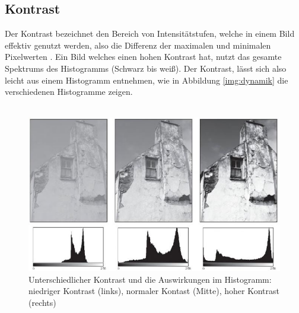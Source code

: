 \subsection{Kontrast}\label{s.kontrast}
Der Kontrast bezeichnet den Bereich von Intensitätstufen, welche in einem Bild effektiv genutzt werden, also die Differenz der maximalen und minimalen Pixelwerten \cite[44]{burger2009digitale}. Ein Bild welches einen hohen Kontrast hat, nutzt das gesamte Spektrums des Histogramms (Schwarz bis weiß). Der Kontrast, lässt sich also leicht aus einem Histogramm entnehmen, wie in Abbildung \ref{img:dynamik} die verschiedenen Histogramme zeigen.\\\\
  \begin{figure}
    [h]
    \centering
    \includegraphics[scale=0.7]{Sources/kontrast.JPG}
    \caption{Unterschiedlicher Kontrast und die Auswirkungen im Histogramm: niedriger Kontrast (links), normaler Kontast (Mitte), hoher Kontrast (rechts)\cite[45]{burger2009digitale}}
    \label{img:kontrast}
  \end{figure}\\
